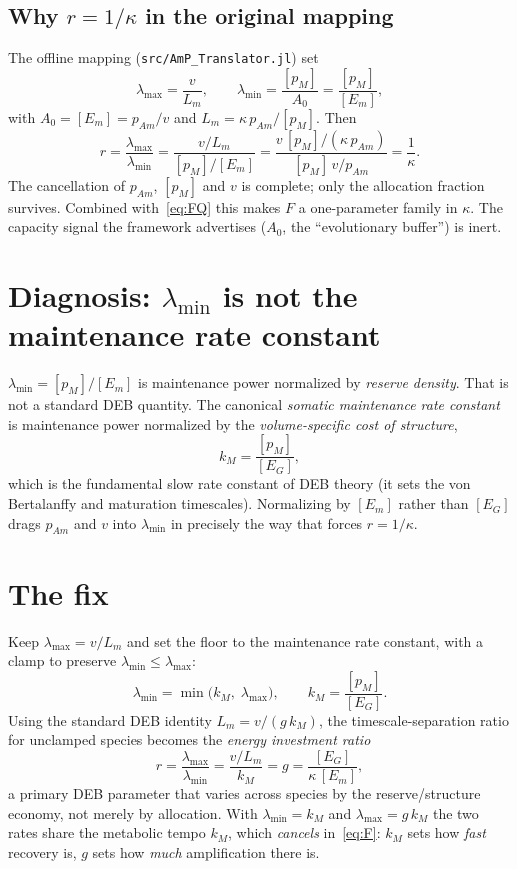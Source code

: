 \documentclass[11pt]{article}
\newcommand{\Em}{[E_m]}
\newcommand{\EG}{[E_G]}
\newcommand{\pM}{[p_M]}
\begin{document}
\subsection{Why $r=1/\kappa$ in the original mapping}
The offline mapping (\texttt{src/AmP\_Translator.jl}) set
\begin{equation}
\lambda_{\max}=\frac{v}{L_m},
\qquad
\lambda_{\min}=\frac{\pM}{A_0}=\frac{\pM}{\Em},
\end{equation}
with $A_0=\Em=p_{Am}/v$ and $L_m=\kappa\,p_{Am}/\pM$. Then
\begin{equation}
r=\frac{\lambda_{\max}}{\lambda_{\min}}
 =\frac{v/L_m}{\pM/\Em}
 =\frac{v\,\pM/(\kappa\,p_{Am})}{\pM\,v/p_{Am}}
 =\frac{1}{\kappa}.
\end{equation}
The cancellation of $p_{Am}$, $\pM$ and $v$ is complete; only the allocation fraction
survives. Combined with~\eqref{eq:FQ} this makes $F$ a one-parameter family in
$\kappa$. The capacity signal the framework advertises ($A_0$, the ``evolutionary
buffer'') is inert.

\section{Diagnosis: $\lambda_{\min}$ is not the maintenance rate constant}
$\lambda_{\min}=\pM/\Em$ is maintenance power normalized by \emph{reserve density}.
That is not a standard DEB quantity. The canonical \emph{somatic maintenance rate
constant} is maintenance power normalized by the \emph{volume-specific cost of
structure},
\begin{equation}
k_M=\frac{\pM}{\EG},
\end{equation}
which is the fundamental slow rate constant of DEB theory (it sets the von Bertalanffy
and maturation timescales). Normalizing by $\Em$ rather than $\EG$ drags $p_{Am}$ and
$v$ into $\lambda_{\min}$ in precisely the way that forces $r=1/\kappa$.

\section{The fix}
Keep $\lambda_{\max}=v/L_m$ and set the floor to the maintenance rate constant, with a
clamp to preserve $\lambda_{\min}\le\lambda_{\max}$:
\begin{equation}
\boxed{\;\lambda_{\min}=\min\!\bigl(k_M,\;\lambda_{\max}\bigr),\qquad k_M=\frac{\pM}{\EG}.\;}
\end{equation}
Using the standard DEB identity $L_m=v/(g\,k_M)$, the timescale-separation ratio for
unclamped species becomes the \emph{energy investment ratio}
\begin{equation}
r=\frac{\lambda_{\max}}{\lambda_{\min}}=\frac{v/L_m}{k_M}=g=\frac{\EG}{\kappa\,\Em},
\end{equation}
a primary DEB parameter that varies across species by the reserve/structure economy,
not merely by allocation. With $\lambda_{\min}=k_M$ and $\lambda_{\max}=g\,k_M$ the two
rates share the metabolic tempo $k_M$, which \emph{cancels} in~\eqref{eq:F}: $k_M$ sets
how \emph{fast} recovery is, $g$ sets how \emph{much} amplification there is.
\end{document}

